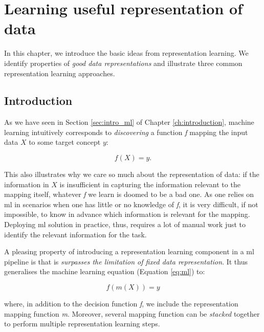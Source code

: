 \chapter{Learning useful representation of data}\label{ch:learningrepresentations}



In this chapter, we introduce the basic ideas from representation learning.
We identify properties of \textit{good data representations} and illustrate three common representation learning approaches.




\section{Introduction}


As we have seen in Section \ref{sec:intro_ml} of Chapter \ref{ch:introduction}, machine learning intuitively corresponds to \textit{discovering} a function \textit{f} mapping the input data $X$ to some target concept $y$:

\begin{equation}
	f(X) = y.
	\label{eq:ml}
\end{equation}


This also illustrates why we care so much about the representation of data: if the information in $X$ is insufficient in capturing the information relevant to the mapping itself, whatever \textit{f} we learn  is doomed to be a bad one.
As one relies on \gls{ml} in scenarios when one has little or no knowledge of \textit{f}, it is very difficult, if not impossible, to know in advance which information is relevant for the mapping.
Deploying \gls{ml} solution in practice, thus, requires a lot of manual work just to identify the relevant information for the task.



A pleasing property of introducing a representation learning component in a \gls{ml} pipeline is that is \textit{surpasses the limitation of fixed data representation}.
It thus generalises the machine learning equation (Equation \ref{eq:ml}) to:

\begin{equation}
	f(m(X)) = y
\end{equation}

where, in addition to the decision function \textit{f}, we include the representation mapping function \textit{m}.
Moreover, several mapping function can be \textit{stacked} together to perform multiple representation learning steps.







